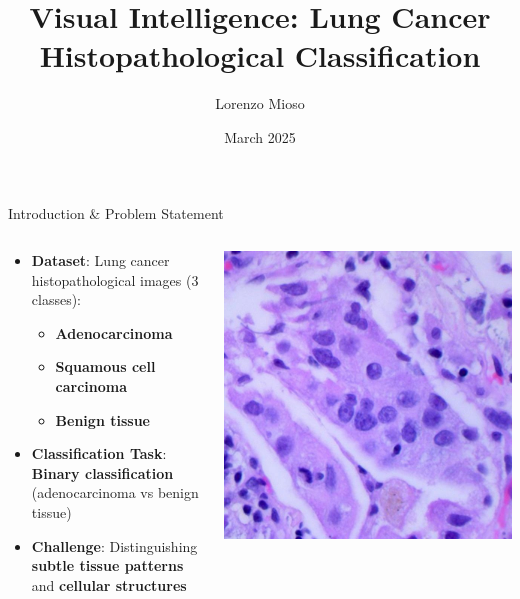 \documentclass[aspectratio=169,8pt]{beamer}  %
\title{Visual Intelligence: Lung Cancer Histopathological Classification}
\author{Lorenzo Mioso}
\date{March 2025}
\begin{document}
\begin{frame}
\titlepage
\end{frame}

\begin{frame}{Introduction \& Problem Statement}
\begin{columns}[T]
\begin{column}{0.5\textwidth}
\begin{itemize}
\item \textbf{Dataset}: Lung cancer histopathological images (3 classes):
  \begin{itemize}
  \item \textbf{Adenocarcinoma}
  \item \textbf{Squamous cell carcinoma}
  \item \textbf{Benign tissue}
  \end{itemize}
\item \textbf{Classification Task}: \textbf{Binary classification} (adenocarcinoma vs benign tissue)
\item \textbf{Challenge}: Distinguishing \textbf{subtle tissue patterns} and \textbf{cellular structures}
\end{itemize}
\end{column}
\begin{column}{0.5\textwidth}
\hfill\includegraphics[width=0.95\linewidth, height=0.45\textheight]{imgs/adenocarcinoma.jpg}

\end{column}
\end{columns}
\end{frame}
\end{document}
